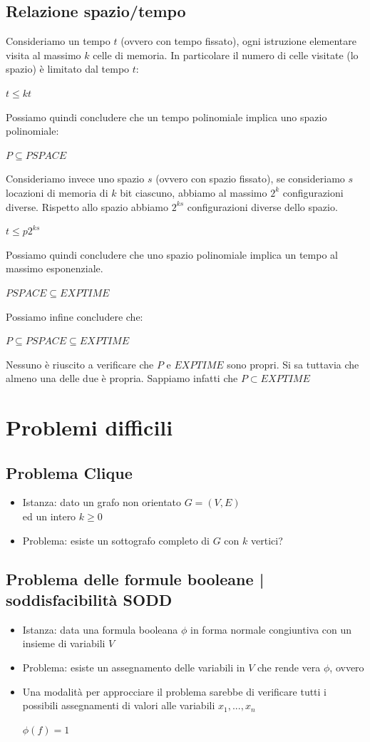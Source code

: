 \documentclass[11pt, oneside]{article}   	%
\begin{document}
\subsection*{Relazione spazio/tempo}
Consideriamo un tempo $t$ (ovvero con tempo fissato), ogni istruzione elementare visita al massimo $k$ celle di memoria. In particolare il numero di celle visitate (lo spazio) è limitato dal tempo $t$:
\begin{center}
$t \leq kt$
\end{center}
Possiamo quindi concludere che un tempo polinomiale implica uno spazio polinomiale:
\begin{center}
$P \subseteq PSPACE$
\end{center}
Consideriamo invece uno spazio $s$ (ovvero con spazio fissato), se consideriamo $s$ locazioni di memoria di $k$ bit ciascuno, abbiamo al massimo $2^k$ configurazioni diverse. Rispetto allo spazio abbiamo $2^{ks}$ configurazioni diverse dello spazio.
\begin{center}
$t \leq p2^{ks}$
\end{center}
Possiamo quindi concludere che uno spazio polinomiale implica un tempo al massimo esponenziale.
\begin{center}
$PSPACE \subseteq EXPTIME$
\end{center}
Possiamo infine concludere che:
\begin{center}
$P \subseteq PSPACE \subseteq EXPTIME$
\end{center}
Nessuno è riuscito a verificare che $P$ e $EXPTIME$ sono propri. Si sa tuttavia che almeno una delle due è propria. Sappiamo infatti che $P \subset EXPTIME$
\section*{Problemi difficili}
\subsection*{Problema Clique}
\begin{itemize}
\item Istanza: dato un grafo non orientato $G= (V,E)$ \\
ed un intero $k \geq 0$
\item Problema: esiste un sottografo completo di $G$ con $k$ vertici?
\end{itemize}
\subsection*{Problema delle formule booleane | soddisfacibilità SODD}
\begin{itemize}
\item Istanza: data una formula booleana $\phi$ in forma normale congiuntiva con un insieme di variabili $V$
\item Problema: esiste un assegnamento delle variabili in $V$ che rende vera $\phi$, ovvero
\item Una modalità per approcciare il problema sarebbe di verificare tutti i possibili assegnamenti di valori alle variabili $x_1, ..., x_n$
\begin{center}
$\phi(f) = 1$
\end{center}
\end{itemize}
\end{document}
